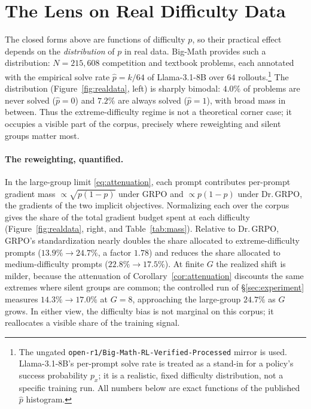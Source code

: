 \documentclass[11pt]{article}
\theoremstyle{plain}
\theoremstyle{definition}
\begin{document}
\section{The Lens on Real Difficulty Data}
\label{sec:realdata}

The closed forms above are functions of difficulty $p$, so their practical effect depends on the \emph{distribution} of $p$ in real data. Big-Math \citep{albalak2025bigmath} provides such a distribution: $N=215{,}608$ competition and textbook problems, each annotated with the empirical solve rate $\hat p=k/64$ of Llama-3.1-8B over $64$ rollouts.\footnote{The ungated \texttt{open-r1/Big-Math-RL-Verified-Processed} mirror is used. Llama-3.1-8B's per-prompt solve rate is treated as a stand-in for a policy's success probability $p_x$; it is a realistic, fixed difficulty distribution, not a specific training run. All numbers below are exact functions of the published $\hat p$ histogram.} The distribution (Figure~\ref{fig:realdata}, left) is sharply bimodal: $4.0\%$ of problems are never solved ($\hat p=0$) and $7.2\%$ are always solved ($\hat p=1$), with broad mass in between. Thus the extreme-difficulty regime is not a theoretical corner case; it occupies a visible part of the corpus, precisely where reweighting and silent groups matter most.

\paragraph{The reweighting, quantified.} In the large-group limit \eqref{eq:attenuation}, each prompt contributes per-prompt gradient mass $\propto\sqrt{p(1-p)}$ under GRPO and $\propto p(1-p)$ under Dr.\,GRPO, the gradients of the two implicit objectives. Normalizing each over the corpus gives the share of the total gradient budget spent at each difficulty (Figure~\ref{fig:realdata}, right, and Table~\ref{tab:mass}). Relative to Dr.\,GRPO, GRPO's standardization nearly doubles the share allocated to extreme-difficulty prompts ($13.9\%\to24.7\%$, a factor $1.78$) and reduces the share allocated to medium-difficulty prompts ($22.8\%\to17.5\%$). At finite $G$ the realized shift is milder, because the attenuation of Corollary~\ref{cor:attenuation} discounts the same extremes where silent groups are common; the controlled run of \S\ref{sec:experiment} measures $14.3\%\to17.0\%$ at $G=8$, approaching the large-group $24.7\%$ as $G$ grows. In either view, the difficulty bias is not marginal on this corpus; it reallocates a visible share of the training signal.
\end{document}
